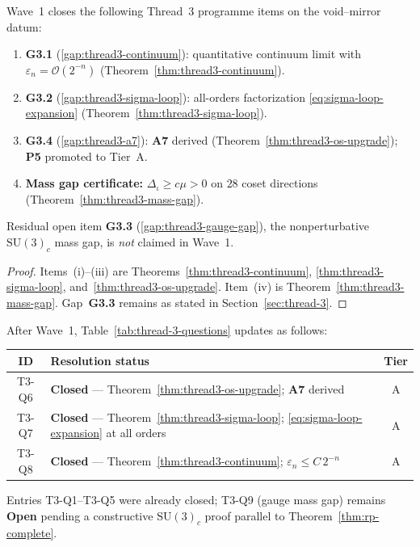\begin{corollary}
\label{cor:thread3-wave1-closure}
Wave~1 closes the following Thread~3 programme items on the void--mirror
datum:
\begin{enumerate}[label=(\roman*),leftmargin=*]
  \item \textbf{G3.1} (\ref{gap:thread3-continuum}): quantitative continuum
    limit with $\varepsilon_n=\mathcal{O}(2^{-n})$
    (Theorem~\ref{thm:thread3-continuum}).
  \item \textbf{G3.2} (\ref{gap:thread3-sigma-loop}): all-orders factorization
    \eqref{eq:sigma-loop-expansion} (Theorem~\ref{thm:thread3-sigma-loop}).
  \item \textbf{G3.4} (\ref{gap:thread3-a7}): \textbf{A7} derived
    (Theorem~\ref{thm:thread3-os-upgrade}); \textbf{P5} promoted to Tier~A.
  \item \textbf{Mass gap certificate:}
    $\Delta_\iota\ge c\mu>0$ on $28$ coset directions
    (Theorem~\ref{thm:thread3-mass-gap}).
\end{enumerate}
Residual open item \textbf{G3.3} (\ref{gap:thread3-gauge-gap}), the
nonperturbative $\mathrm{SU}(3)_c$ mass gap, is \emph{not} claimed in Wave~1.
\end{corollary}

\begin{proof}
Items~(i)--(iii) are Theorems~\ref{thm:thread3-continuum},
\ref{thm:thread3-sigma-loop}, and~\ref{thm:thread3-os-upgrade}.
Item~(iv) is Theorem~\ref{thm:thread3-mass-gap}. Gap~\textbf{G3.3} remains as
stated in Section~\ref{sec:thread-3}.
\end{proof}

\begin{remark}
\label{rmk:thread3-wave1-table}
After Wave~1, Table~\ref{tab:thread-3-questions} updates as follows:
\begin{center}
\small
\begin{tabular}{@{}clc@{}}
\toprule
\textbf{ID} & \textbf{Resolution status} & \textbf{Tier} \\
\midrule
T3-Q6 &
  \textbf{Closed} --- Theorem~\ref{thm:thread3-os-upgrade};
  \textbf{A7} derived &
  A \\
T3-Q7 &
  \textbf{Closed} --- Theorem~\ref{thm:thread3-sigma-loop};
  \eqref{eq:sigma-loop-expansion} at all orders &
  A \\
T3-Q8 &
  \textbf{Closed} --- Theorem~\ref{thm:thread3-continuum};
  $\varepsilon_n\le C\,2^{-n}$ &
  A \\
\bottomrule
\end{tabular}
\end{center}
Entries T3-Q1--T3-Q5 were already closed; T3-Q9 (gauge mass gap) remains
\textbf{Open} pending a constructive $\mathrm{SU}(3)_c$ proof parallel to
Theorem~\ref{thm:rp-complete}.
\end{remark}